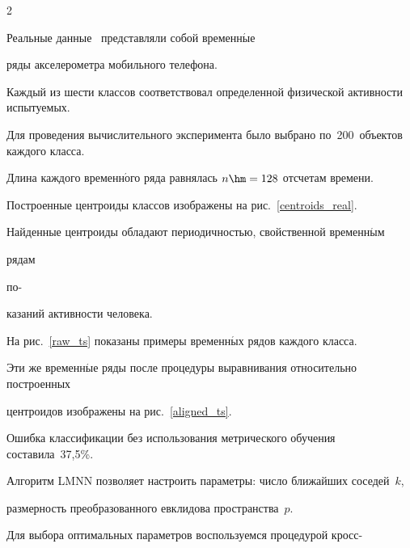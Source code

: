 \begin{multicols}{2}














Реальные данные~\cite{UCI_HarDataset} представляли собой вре\-мен\-н$\acute{\mbox{ы}}$е 


ряды  акселерометра мобильного телефона.


Каж\-дый из шести классов соответствовал определенной физической активности испытуемых.


Для проведения вычислительного эксперимента было выбрано по~200~объектов каж\-до\-го класса.


Длина каж\-до\-го временн$\acute{\mbox{о}}$го ряда равнялась $n \hm= 128$ отсчетам времени.











Построенные центроиды классов изображены на рис.~\ref{centroids_real}.


Найденные центроиды обладают периодичностью, свойственной временн$\acute{\mbox{ы}}$м 


рядам 


по-\linebreak %





\columnbreak





\noindent


казаний активности человека.


На рис.~\ref{raw_ts} показаны примеры временн$\acute{\mbox{ы}}$х рядов каждого класса. 


Эти же временн$\acute{\mbox{ы}}$е ряды после процедуры выравнивания относительно построенных 


центроидов изображены на рис.~\ref{aligned_ts}.














Ошибка классификации без использования мет\-ри\-ческого обучения составила~37,5\%.


Алгоритм LMNN позволяет настроить параметры: число ближайших соседей~$k$,


размерность преобразованного евклидова пространства~$p$.


Для выбора оптимальных параметров воспользуемся процедурой кросс-\linebreak %





\end{multicols}





